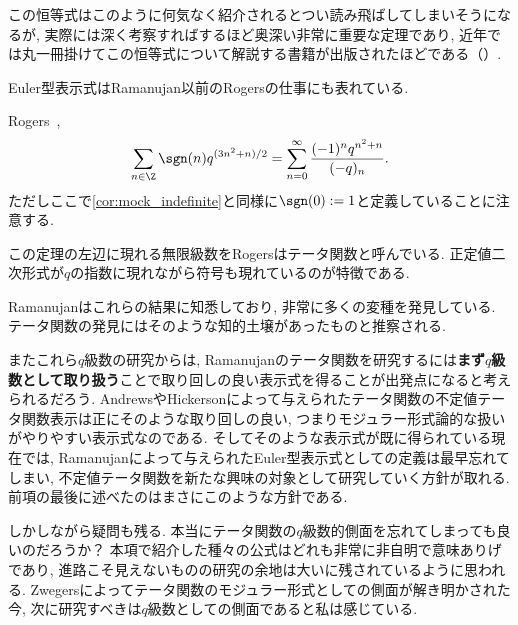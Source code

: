 \documentclass[11pt,b5paper,oneside,lualatex]{ltjsarticle} %
\numberwithin{equation}{section} %
\begin{document}
この恒等式はこのように何気なく紹介されるとつい読み飛ばしてしまいそうになるが, 実際には深く考察すればするほど奥深い非常に重要な定理であり, 近年では丸一冊掛けてこの恒等式について解説する書籍が出版されたほどである（\cite{魅惑}）. 

Euler型表示式はRamanujan以前のRogersの仕事にも表れている. 

\begin{thm}{{Rogers~\cite[pp.~333, Equation (6)]{Rogers}, \cite[240ページ, 式 (A.200)]{魅惑}}}{}
	\begin{align}	
		\sum_{n \in \Z} \sgn(n) q^{(3n^2 + n)/2}
		=
		\sum_{n=0}^{\infty} \frac{(-1)^n q^{n^2 + n}}{(-q)_n}.
	\end{align}
	ただしここで\cref{cor:mock_indefinite}と同様に$ \sgn(0) := 1 $と定義していることに注意する. 
\end{thm}

この定理の左辺に現れる無限級数をRogersはテータ関数と呼んでいる. 
正定値二次形式が$ q $の指数に現れながら符号も現れているのが特徴である. 

Ramanujanはこれらの結果に知悉しており, 非常に多くの変種を発見している. 
テータ関数の発見にはそのような知的土壌があったものと推察される. 

またこれら$ q $級数の研究からは, Ramanujanのテータ関数を研究するには\textbf{まず$ q $級数として取り扱う}ことで取り回しの良い表示式を得ることが出発点になると考えられるだろう. 
AndrewsやHickersonによって与えられたテータ関数の不定値テータ関数表示は正にそのような取り回しの良い, つまりモジュラー形式論的な扱いがやりやすい表示式なのである. 
そしてそのような表示式が既に得られている現在では, Ramanujanによって与えられたEuler型表示式としての定義は最早忘れてしまい, 不定値テータ関数を新たな興味の対象として研究していく方針が取れる. 
前項の最後に述べたのはまさにこのような方針である. 

しかしながら疑問も残る. 
本当にテータ関数の$ q $級数的側面を忘れてしまっても良いのだろうか？
本項で紹介した種々の公式はどれも非常に非自明で意味ありげであり, 進路こそ見えないものの研究の余地は大いに残されているように思われる. 
Zwegersによってテータ関数のモジュラー形式としての側面が解き明かされた今, 次に研究すべきは$ q $級数としての側面であると私は感じている. 
\end{document}
